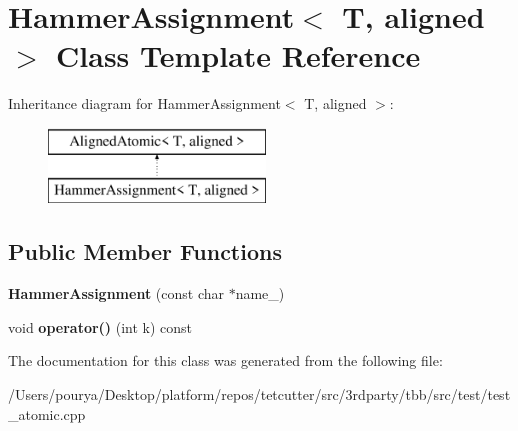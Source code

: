 \hypertarget{classHammerAssignment}{}\section{Hammer\+Assignment$<$ T, aligned $>$ Class Template Reference}
\label{classHammerAssignment}
Inheritance diagram for Hammer\+Assignment$<$ T, aligned $>$\+:\begin{figure}[H]
\begin{center}
\leavevmode
\includegraphics[height=2.000000cm]{classHammerAssignment}
\end{center}
\end{figure}
\subsection*{Public Member Functions}
\begin{DoxyCompactItemize}
\item 
\hypertarget{classHammerAssignment_a9a0dbc5e9e68ecebfc4128c4ae649787}{}{\bfseries Hammer\+Assignment} (const char $\ast$name\+\_\+)\label{classHammerAssignment_a9a0dbc5e9e68ecebfc4128c4ae649787}

\item 
\hypertarget{classHammerAssignment_aca1166b28109e56f206d06c64ae70ed9}{}void {\bfseries operator()} (int k) const \label{classHammerAssignment_aca1166b28109e56f206d06c64ae70ed9}

\end{DoxyCompactItemize}


The documentation for this class was generated from the following file\+:\begin{DoxyCompactItemize}
\item 
/\+Users/pourya/\+Desktop/platform/repos/tetcutter/src/3rdparty/tbb/src/test/test\+\_\+atomic.\+cpp\end{DoxyCompactItemize}
